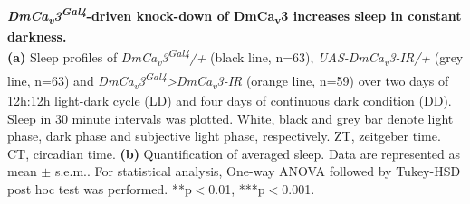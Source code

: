 \label{fig:S3}
\textbf{\emph{DmCa\textsubscript{v}3\textsuperscript{Gal4}}-driven knock-down of DmCa\textsubscript{v}3 increases sleep in constant darkness.}
\\
\textbf{(a)} Sleep profiles of \emph{DmCa\textsubscript{v}3\textsuperscript{Gal4}/+} (black line, n=63), \emph{UAS-DmCa\textsubscript{v}3-IR/+} (grey line, n=63) and \emph{DmCa\textsubscript{v}3\textsuperscript{Gal4}\textgreater{}DmCa\textsubscript{v}3-IR} (orange line, n=59) over two days of 12h:12h light-dark cycle (LD) and four days of continuous dark condition (DD).
Sleep in 30 minute intervals was plotted.
White, black and grey bar denote light phase, dark phase and subjective light phase, respectively.
ZT, zeitgeber time.
CT, circadian time.
\textbf{(b)} Quantification of averaged sleep.
Data are represented as mean $\pm$ s.e.m..
For statistical analysis, One-way ANOVA followed by Tukey-HSD post hoc test was performed.
**p$<$0.01, ***p$<$0.001.
  
  
  
  
  
  
  
  
  
